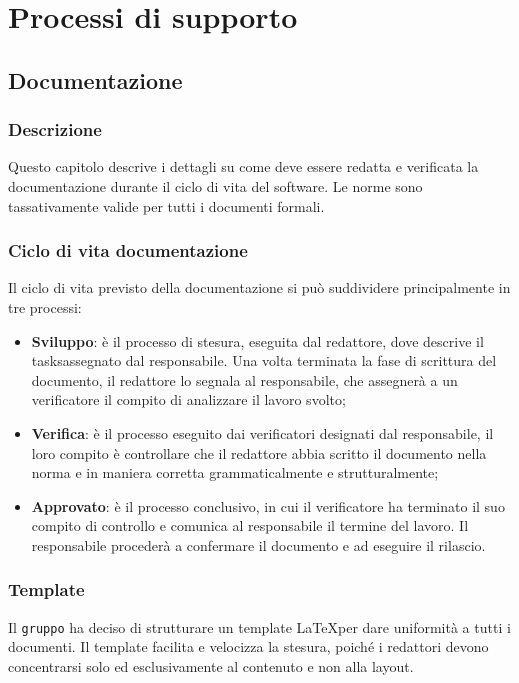 \section{Processi di supporto}

\subsection{Documentazione}

\subsubsection{Descrizione}
Questo capitolo descrive i dettagli su come deve essere redatta e verificata la documentazione durante il ciclo di vita del software. Le norme sono tassativamente valide per tutti i documenti formali.
\subsubsection{Ciclo di vita documentazione}
Il ciclo di vita previsto della documentazione si può suddividere principalmente in tre processi: 
\begin{itemize}
	\item \textbf{Sviluppo}: è il processo di stesura, eseguita dal redattore, dove descrive il tasks\glossario assegnato dal responsabile. Una volta terminata la fase di scrittura del documento, il redattore lo segnala al responsabile, che assegnerà a un verificatore il compito di	analizzare il lavoro svolto;
 	\item \textbf{Verifica}: è il processo eseguito dai verificatori designati dal responsabile, il loro compito è controllare che il redattore abbia scritto il documento nella norma e in maniera corretta grammaticalmente e strutturalmente;
 	\item \textbf{Approvato}: è il processo conclusivo, in cui il verificatore ha terminato il suo compito di controllo e comunica al responsabile il termine del lavoro. Il responsabile procederà a confermare il documento e ad eseguire il rilascio.
\end{itemize} 

\subsubsection{Template}
Il \texttt{gruppo} ha deciso di strutturare un template \LaTeX per dare uniformità a tutti i documenti. Il template facilita e velocizza la stesura, poiché i redattori devono concentrarsi solo ed esclusivamente al contenuto e non alla layout.  

